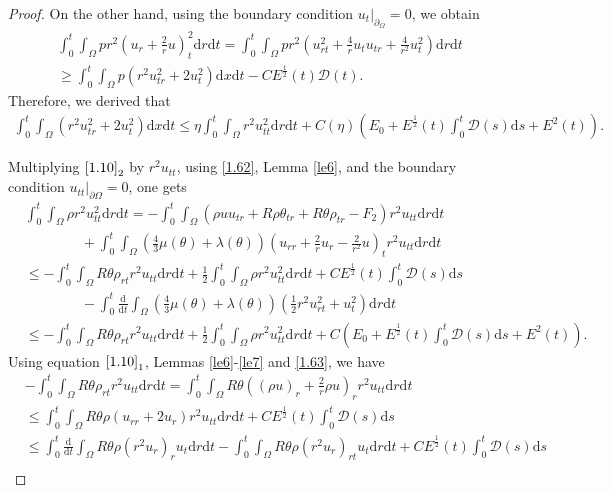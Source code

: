 \documentclass[11pt,reqno]{amsart}
\numberwithin{equation}{section}
\newcommand{\dif}{\mathrm{d}}
\newcommand{\intx}{\int_0^t \int_{\Omega} }
\begin{document}
\begin{proof}
On the other hand, using the boundary condition $u_t|_{\partial_\Omega}=0$, we obtain
\begin{align*}
\intx p r^2 \left(u_r+\frac{2}{r}u\right)_t^2 \dif r \dif t=\intx p r^2(u_{rt}^2+\frac{4}{r} u_t u_{tr}+\frac{4}{r^2} u_t^2 ) \dif r \dif t \\
\ge \intx p(r^2 u_{tr}^2+2u_t^2) \dif x \dif t- CE^\frac{1}{2}(t)\mathcal D(t).
\end{align*}
Therefore, we derived that
\begin{align}\label{1.63}
\intx (r^2 u_{tr}^2+2u_t^2) \dif x \dif t \le \eta \intx r^2 u_{tt}^2 \dif r\dif t +C(\eta)(E_0+E^\frac{1}{2}(t) \int_0^t  \mathcal D(s)\dif s+E^2(t)).
\end{align}

Multiplying $\eqref{1.10}_2$ by $r^2 u_{tt}$,  using \eqref{1.62}, Lemma \ref{le6}, and the boundary condition $u_{tt}|_{\partial\Omega}=0$, one gets
\begin{align*}
&\intx \rho r^2 u_{tt}^2\dif r \dif t =-\intx \left( \rho u u_{tr}+R\rho \theta_{tr}+R\theta \rho_{tr}-F_2\right) r^2 u_{tt}\dif r \dif t\\
&\qquad\qquad+\intx (\frac{4}{3} \mu(\theta)+\lambda(\theta))\left(u_{rr}+\frac{2}{r} u_r-\frac{2}{r^2} u\right)_t r^2 u_{tt} \dif r \dif t\\
&\le -\intx R \theta \rho_{rt} r^2 u_{tt}\dif r \dif t +\frac{1}{2} \intx \rho r^2 u_{tt}^2\dif r \dif t +CE^\frac{1}{2}(t) \int_0^t  \mathcal D(s)\dif s\\
&\qquad\qquad -\int_0^t \frac{\dif}{\dif t} \int_{\Omega} \left(\frac{4}{3} \mu(\theta)+\lambda(\theta)\right)\left(\frac{1}{2} r^2u_{rt}^2+u_t^2\right) \dif r \dif t\\
&\le -\intx R \theta \rho_{rt} r^2 u_{tt}\dif r \dif t +\frac{1}{2} \intx \rho r^2 u_{tt}^2\dif r \dif t +C(E_0+E^\frac{1}{2}(t) \int_0^t  \mathcal D(s)\dif s+E^2(t)).
\end{align*}
Using equation $\eqref{1.10}_1$, Lemmas \ref{le6}-\ref{le7} and \eqref{1.63}, we have
\begin{align*}
&-\intx R\theta \rho_{rt} r^2 u_{tt}\dif r\dif t =\intx R\theta\left( (\rho u)_r+\frac{2}{r}\rho u\right)_r r^2 u_{tt}\dif r \dif t\\
&\le \intx R \theta \rho (u_{rr}+2u_r)r^2 u_{tt} \dif r \dif t+CE^\frac{1}{2}(t) \int_0^t  \mathcal D(s)\dif s\\
&\le\int_0^t \frac{\dif }{\dif t} \int_{\Omega} R\theta \rho (r^2u_r)_r u_t \dif r \dif t -\intx R\theta \rho(r^2u_r)_{rt} u_t \dif r \dif t+CE^\frac{1}{2}(t) \int_0^t  \mathcal D(s)\dif s\\

\end{align*}
\end{proof}
\end{document}
